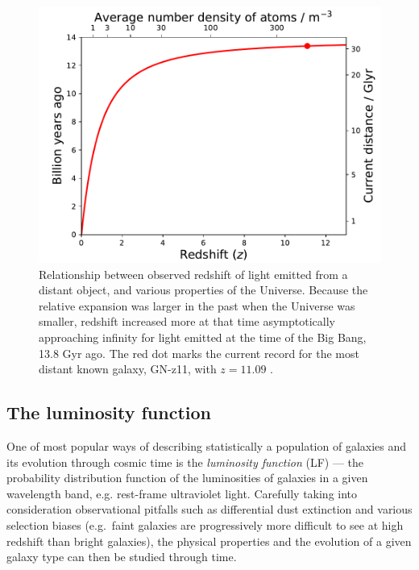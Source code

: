 \documentclass[useAMS,usenatbib,bibyear]{aa}
\begin{document}
\begin{figure}[!t]
    \begin{center}
        \includegraphics[width=0.98\linewidth]{redshift.pdf}
        \caption{Relationship between observed redshift of light emitted from a distant object, and various properties of the Universe.
        Because the relative expansion was larger in the past when the Universe was smaller, redshift increased more at that time asymptotically approaching infinity for light emitted at the time of the Big Bang, 13.8 Gyr ago.
        The red dot marks the current record for the most distant known galaxy, GN-z11, with $z=11.09$ \citep{Oesch2016}.}
        \label{fig:redshift}
    \end{center}
\end{figure}

\subsection{The luminosity function}
\label{sec:LF}

One of most popular ways of describing statistically a population of galaxies and its evolution through cosmic time is the \emph{luminosity function} (LF) --- the probability distribution function of the luminosities of galaxies in a given wavelength band, e.g. rest-frame ultraviolet light.
Carefully taking into consideration observational pitfalls such as differential dust extinction and various selection biases (e.g.~faint galaxies are progressively more difficult to see at high redshift than bright galaxies), the physical properties and the evolution of a given galaxy type can then be studied through time.
\end{document}
